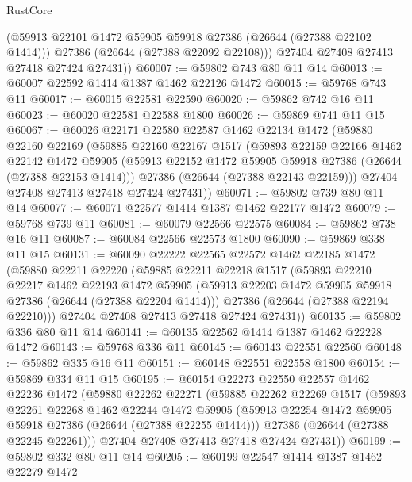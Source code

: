 \begin{lexlean}{RustCore}
\begin{coremodule}
          (@59913 @22101 @1472 @59905 @59918 @27386 (@26644 (@27388 @22102 @1414)))
          @27386
          (@26644 (@27388 @22092 @22108)))
        @27404
        @27408
        @27413
        @27418
        @27424
        @27431))
@60007 := @59802 @743 @80 @11 @14
@60013 := @60007 @22592 @1414 @1387 @1462 @22126 @1472
@60015 := @59768 @743 @11
@60017 := @60015 @22581 @22590
@60020 := @59862 @742 @16 @11
@60023 := @60020 @22581 @22588 @1800
@60026 := @59869 @741 @11 @15
@60067 := @60026
    @22171
    @22580
    @22587
    @1462
    @22134
    @1472
    (@59880
      @22160
      @22169
      (@59885
        @22160
        @22167
        @1517
        (@59893
          @22159
          @22166
          @1462
          @22142
          @1472
          @59905
          (@59913 @22152 @1472 @59905 @59918 @27386 (@26644 (@27388 @22153 @1414)))
          @27386
          (@26644 (@27388 @22143 @22159)))
        @27404
        @27408
        @27413
        @27418
        @27424
        @27431))
@60071 := @59802 @739 @80 @11 @14
@60077 := @60071 @22577 @1414 @1387 @1462 @22177 @1472
@60079 := @59768 @739 @11
@60081 := @60079 @22566 @22575
@60084 := @59862 @738 @16 @11
@60087 := @60084 @22566 @22573 @1800
@60090 := @59869 @338 @11 @15
@60131 := @60090
    @22222
    @22565
    @22572
    @1462
    @22185
    @1472
    (@59880
      @22211
      @22220
      (@59885
        @22211
        @22218
        @1517
        (@59893
          @22210
          @22217
          @1462
          @22193
          @1472
          @59905
          (@59913 @22203 @1472 @59905 @59918 @27386 (@26644 (@27388 @22204 @1414)))
          @27386
          (@26644 (@27388 @22194 @22210)))
        @27404
        @27408
        @27413
        @27418
        @27424
        @27431))
@60135 := @59802 @336 @80 @11 @14
@60141 := @60135 @22562 @1414 @1387 @1462 @22228 @1472
@60143 := @59768 @336 @11
@60145 := @60143 @22551 @22560
@60148 := @59862 @335 @16 @11
@60151 := @60148 @22551 @22558 @1800
@60154 := @59869 @334 @11 @15
@60195 := @60154
    @22273
    @22550
    @22557
    @1462
    @22236
    @1472
    (@59880
      @22262
      @22271
      (@59885
        @22262
        @22269
        @1517
        (@59893
          @22261
          @22268
          @1462
          @22244
          @1472
          @59905
          (@59913 @22254 @1472 @59905 @59918 @27386 (@26644 (@27388 @22255 @1414)))
          @27386
          (@26644 (@27388 @22245 @22261)))
        @27404
        @27408
        @27413
        @27418
        @27424
        @27431))
@60199 := @59802 @332 @80 @11 @14
@60205 := @60199 @22547 @1414 @1387 @1462 @22279 @1472

\end{coremodule}
\end{lexlean}
